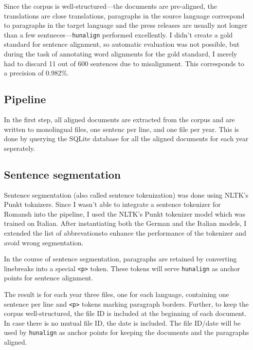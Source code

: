 Since the corpus is well-structured---the documents are pre-aligned, the translations are close translations, paragraphs in the source language correspond to paragraphs in the target language and the press releases are usually not longer than a few sentneces---\texttt{hunalign} performed excellently. 
I didn't create a gold standard for sentence alignment, so automatic evaluation was not possible, but during the task of annotating word alignments for the gold standard, I merely had to discard 11 out of 600 sentences due to  misalignment. 
This corresponds to a precision of 0.982\%.

\subsection{Pipeline}
In the first step, all aligned documents are extracted from the corpus and are written to monolingual files, one sentenc per line, and one file per year.
This is done by querying the SQLite database for all the aligned documents for each year seperately. 

\subsection{Sentence segmentation}
Sentence segmentation (also called sentence tokenization) was done using NLTK's Punkt toknizers. 
Since I wasn't able to integrate a sentence tokenizer for Romansh into the pipeline, I used the NLTK's Punkt tokenizer model which was trained on Italian. 
After instantiating both the German and the Italian models, I extended the list of abbrevations\footnotemark to enhance the performance of the tokenizer and avoid wrong segmentation. 


In the course of sentence segmentation, paragraphs are retained by converting linebreaks into a special \texttt{<p>} token. 
These tokens will serve \texttt{hunalign} as anchor points for sentence alignment.

The result is for each year three files, one for each language, containing one sentence per line and \texttt{<p>} tokens marking paragraph borders. 
Further, to keep the corpus well-structured, the file ID is included at the beginning of each document. 
In case there is no mutual file ID, the date is included. 
The file ID/date will be used by \texttt{hunalign} as anchor points for keeping the documents and the paragraphs aligned.


